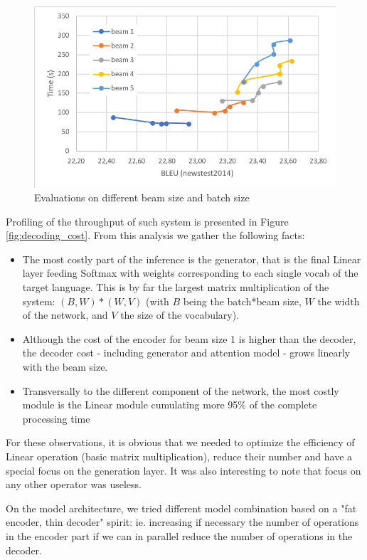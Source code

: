 \documentclass[11pt,a4paper]{article}
\begin{document}
\begin{figure}
\includegraphics[width=\linewidth]{beambatch.png}
\caption{Evaluations on different beam size and batch size}
\label{fig:beam_batch_bleu}
\end{figure}

Profiling of the throughput of such system is presented in Figure \ref{fig:decoding_cost}. From this analysis we gather the following facts:

\begin{itemize}
\item The most costly part of the inference is the generator, that is the final Linear layer feeding Softmax with weights corresponding to each single vocab of the target language. This is by far the largest matrix multiplication of the system: $(B,W) * (W,V)$ (with $B$ being the batch*beam size, $W$ the width of the network, and $V$ the size of the vocabulary).
\item Although the cost of the encoder for beam size 1 is higher than the decoder, the decoder cost - including generator and attention model - grows linearly with the beam size.
\item Transversally to the different component of the network, the most costly module is the Linear module cumulating more 95\% of the complete processing time
\end{itemize}

For these observations, it is obvious that we needed to optimize the efficiency of Linear operation (basic matrix multiplication), reduce their number and have a special focus on the generation layer. It was also interesting to note that focus on any other operator was useless.

On the model architecture, we tried different model combination based on a "fat encoder, thin decoder" spirit: ie. increasing if necessary the number of operations in the encoder part if we can in parallel reduce the number of operations in the decoder.
\end{document}
